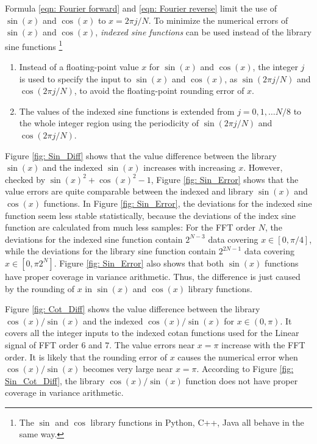 \documentclass[twoside]{article}
\numberwithin{equation}{section}
\begin{document}
Formula \eqref{eqn: Fourier forward} and \eqref{eqn: Fourier reverse} limit the use of $\sin(x)$ and $\cos(x)$ to $x = 2\pi j/N$.
To minimize the numerical errors of $\sin(x)$ and $\cos(x)$, \emph{indexed sine functions} can be used instead of the library sine functions \footnote{The $\sin$ and $\cos$ library functions in Python, C++, Java all behave in the same way.}
\begin{enumerate}
\item Instead of a floating-point value $x$ for $\sin(x)$ and $\cos(x)$, the integer $j$ is used to specify the input to $\sin(x)$ and $\cos(x)$, as $\sin(2\pi j/N)$ and $\cos(2\pi j/N)$, to avoid the floating-point rounding error of $x$.

\item The values of the indexed sine functions is extended from $j = 0,1,\dots N/8$ to the whole integer region using the periodicity of $\sin(2\pi j/N)$ and $\cos(2\pi j/N)$.

\end{enumerate}

Figure \ref{fig: Sin_Diff} shows that the value difference between the library $\sin(x)$ and the indexed $\sin(x)$ increases with increasing $x$.
However, checked by $\sin(x)^2 + \cos(x)^2 - 1$, Figure \ref{fig: Sin_Error} shows that the value errors are quite comparable between  the indexed and library $\sin(x)$ and $\cos(x)$ functions.
In Figure \ref{fig: Sin_Error}, the deviations for the indexed sine function seem less stable statistically, because the deviations of the index sine function are calculated from much less samples: For the FFT order $N$, the deviations for the indexed sine function contain $2^{N-3}$ data covering $x \in [0, \pi/4]$, while the deviations for the library sine function contain $2^{2N-1}$ data covering $x \in [0, \pi 2^{N}]$.
Figure \ref{fig: Sin_Error} also shows that both $\sin(x)$ functions have proper coverage in variance arithmetic.
Thus, the difference is just caused by the rounding of $x$ in $\sin(x)$ and $\cos(x)$ library functions.

Figure \ref{fig: Cot_Diff} shows the value difference between the library $\cos(x)/\sin(x)$ and the indexed $\cos(x)/\sin(x)$ for $x \in (0, \pi)$.
It covers all the integer inputs to the indexed cotan functions used for the Linear signal of FFT order $6$ and $7$.
The value errors near $x = \pi$ increase with the FFT order.
It is likely that the rounding error of $x$ causes the numerical error when $\cos(x)/\sin(x)$ becomes very large near $x = \pi$.
According to Figure \ref{fig: Sin_Cot_Diff}, the library $\cos(x)/\sin(x)$ function does not have proper coverage in variance arithmetic.
\end{document}
